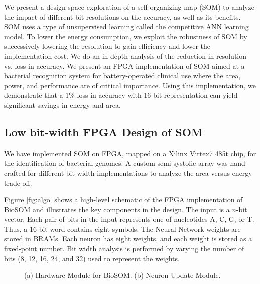 \documentclass[a4paper,10pt]{article}
\begin{document}
We present a design space exploration of a self-organizing map (SOM) to analyze the impact of different bit resolutions on the accuracy, as well as its benefits. SOM uses a type of unsupervised learning called the competitive ANN learning model. To lower the energy consumption, we exploit the robustness of SOM by successively lowering the resolution to gain efficiency and lower the implementation cost. We do an in-depth analysis of the reduction in resolution vs. loss in accuracy. We present an FPGA implementation of SOM aimed at a bacterial recognition system for battery-operated clinical use where the area, power, and performance are of critical importance. Using this implementation, we demonstrate that a 1\% loss in accuracy with 16-bit representation can yield significant savings in energy and area.

\subsection{Low bit-width FPGA Design of SOM}
We have implemented SOM on FPGA, mapped on a Xilinx Virtex7 485t chip, for the identification of bacterial genomes. A custom semi-systolic array was hand-crafted for different bit-width implementations to analyze the area versus energy trade-off.

Figure \ref{fig:algo} shows a high-level schematic of the FPGA implementation of BioSOM and illustrates the key components in the design. The input is a $n$-bit vector. Each pair of bits in the input represents one of nucleotides A, C, G, or T. Thus, a 16-bit word contains eight symbols. The Neural Network weights are stored in BRAMs. Each neuron has eight weights, and each weight is stored as a fixed-point number. Bit width analysis is performed by varying the number of bits (8, 12, 16, 24, and 32) used to represent the weights.

\begin{figure}[!htb]
	\centering
    \captionsetup{font=sf}
	\hfil
	\caption{(a) Hardware Module for BioSOM. (b) Neuron Update Module.}	\label{fig:SOMFPGAImplementation}
\end{figure}
\end{document}
